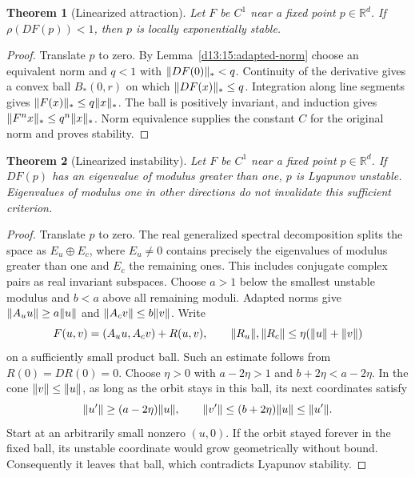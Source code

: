\documentclass[11pt,oneside]{book}
\newtheorem{theorem}{Theorem}[chapter]
\theoremstyle{definition}
\theoremstyle{remark}\newtheorem{remark}[theorem]{Remark}
\newcommand{\R}{\mathbb R}\newcommand{\C}{\mathbb C}
\begin{document}
\begin{theorem}[Linearized attraction]\label{d13:15:linearized-stability}
Let \(F\) be \(C^1\) near a fixed point \(p\in\R^d\). If
\(\rho(DF(p))<1\), then \(p\) is locally exponentially stable.
\end{theorem}
\begin{proof}
Translate \(p\) to zero. By Lemma~\ref{d13:15:adapted-norm} choose an
equivalent norm and \(q<1\) with \(\lVert DF(0)\rVert_*<q\). Continuity of the
derivative gives a convex ball \(B_*(0,r)\) on which
\(\lVert DF(x)\rVert_*\leq q\). Integration along line segments gives
\(\lVert F(x)\rVert_*\leq q\lVert x\rVert_*\). The ball is positively invariant, and
induction gives \(\lVert F^nx\rVert_*\leq q^n\lVert x\rVert_*\). Norm equivalence
supplies the constant \(C\) for the original norm and proves stability.
\end{proof}

\begin{theorem}[Linearized instability]\label{d13:15:linearized-instability}
Let \(F\) be \(C^1\) near a fixed point \(p\in\R^d\). If \(DF(p)\) has
an eigenvalue of modulus greater than one, \(p\) is Lyapunov unstable.
Eigenvalues of modulus one in other directions do not invalidate this
sufficient criterion.
\end{theorem}
\begin{proof}
Translate \(p\) to zero. The real generalized spectral decomposition
splits the space as \(E_u\oplus E_c\), where \(E_u\neq0\) contains precisely
the eigenvalues of modulus greater than one and \(E_c\) the remaining
ones. This includes conjugate complex pairs as real invariant subspaces.
Choose \(a>1\) below the smallest unstable modulus and \(b<a\) above all
remaining moduli. Adapted norms give
\(\lVert A_uu\rVert\geq a\lVert u\rVert\) and \(\lVert A_cv\rVert\leq b\lVert v\rVert\).
Write
\[
 F(u,v)=(A_uu,A_cv)+R(u,v),\qquad
 \lVert R_u\rVert,\lVert R_c\rVert\leq\eta(\lVert u\rVert+\lVert v\rVert)
\]
on a sufficiently small product ball. Such an estimate follows from
\(R(0)=DR(0)=0\). Choose \(\eta>0\) with
\(a-2\eta>1\) and \(b+2\eta<a-2\eta\).
In the cone \(\lVert v\rVert\leq\lVert u\rVert\), as long as the orbit stays in this
ball, its next coordinates satisfy
\[
 \lVert u'\rVert\geq(a-2\eta)\lVert u\rVert,\qquad
 \lVert v'\rVert\leq(b+2\eta)\lVert u\rVert\leq\lVert u'\rVert.
\]
Start at an arbitrarily small nonzero \((u,0)\). If the orbit stayed
forever in the fixed ball, its unstable coordinate would grow
geometrically without bound. Consequently it leaves that ball, which
contradicts Lyapunov stability.
\end{proof}
\end{document}
